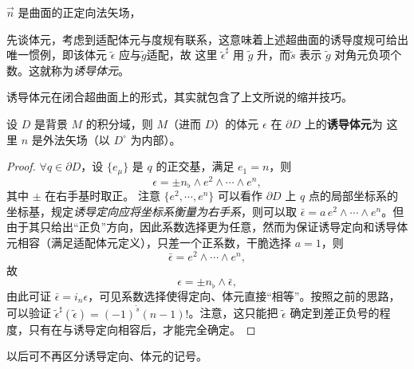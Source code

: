 $\vec n$ 是曲面的正定向法矢场，


先谈体元，考虑到适配体元与度规有联系，这意味着上述超曲面的诱导度规可给出唯一惯例，即该体元 $\tilde\epsilon$ 应与$\tilde g$适配，故
这里 $\tilde\epsilon^\sharp$ 用 $\tilde g$ 升，而$\tilde s$ 表示 $\tilde g$ 对角元负项个数。这就称为\textit{诱导体元}。

诱导体元在闭合超曲面上的形式，其实就包含了上文所说的缩并技巧。

\begin{theorem}
    设 $D$ 是背景 $M$ 的积分域，则 $M$（进而 $D$）的体元 $\epsilon$ 在 $\partial D$ 上的\textbf{诱导体元}为
    这里 $n$ 是外法矢场（以 $D^\circ$ 为内部）。
\end{theorem}
\begin{proof}
    $\forall q\in\partial D$，设 $\{e_\mu\}$ 是 $q$ 的正交基，满足 $e_1=n$，则
    \[
    \epsilon=\pm n_\flat\wedge e^2\wedge\cdots\wedge e^n,
    \]
    其中 $\pm$ 在右手基时取正。
    注意 $\{e^2,\cdots, e^n\}$ 可以看作 $\partial D$ 上 $q$ 点的局部坐标系的坐标基，规定\textit{诱导定向应将坐标系衡量为右手系}，则可以取 $\bar\epsilon=a\,e^2\wedge\cdots\wedge e^n$。但由于其只给出“正负”方向，因此系数选择更为任意，然而为保证诱导定向和诱导体元相容（满足适配体元定义），只差一个正系数，干脆选择 $a=1$，则
    \[
    \bar\epsilon=e^2\wedge\cdots\wedge e^n,
    \]
    故
    \[
    \epsilon=\pm n_\flat\wedge \bar\epsilon,
    \]
    由此可证 $\bar\epsilon=i_n\epsilon$，可见系数选择使得定向、体元直接“相等”。按照之前的思路，可以验证 $\tilde\epsilon^\sharp(\tilde\epsilon)=(-1)^{\tilde s}(n-1)!$。注意，这只能把 $\tilde\epsilon$ 确定到差正负号的程度，只有在与诱导定向相容后，才能完全确定。
\end{proof}
以后可不再区分诱导定向、体元的记号。

